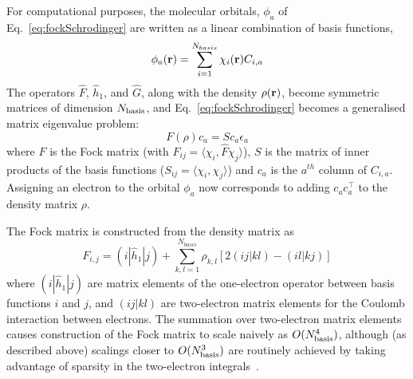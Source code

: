 \documentclass[twoside,11pt]{article}
\begin{document}
For computational purposes, the molecular orbitals, $\phi_a$ of Eq.~\ref{eq:fockSchrodinger} are written as a linear combination of basis functions,
\begin{equation}\label{eq:lcao}
\phi_a({\bf r}) = \sum_{i=1}^{N_{basis}} \chi_i({\bf r}) C_{i,a}
\end{equation}
The operators $\hat{F}$, $\hat{h}_1$, and $\hat{G}$, along with the density $\rho({\bf r})$, become symmetric matrices of dimension $N_{\rm basis}$, and Eq.~\ref{eq:fockSchrodinger} becomes a generalised matrix eigenvalue problem:
\begin{equation}\label{eq:fockMatrix}
F(\rho)c_a = Sc_a\epsilon_a
\end{equation}
where $F$ is the Fock matrix (with $F_{ij} = \langle \chi_i, \hat F\chi_j\rangle$), $S$ is the matrix of inner products of the basis functions ($S_{ij} = \langle\chi_i,\chi_j\rangle$) and $c_a$ is the $a^{th}$ column of $C_{i,a}$.  Assigning an electron to the orbital $\phi_a$ now corresponds to adding $c_a c_a^\top$ to the density matrix $\rho$.

The Fock matrix is constructed from the density matrix as
\begin{equation}\label{eq:fockMatrixFull}
F_{i,j} = (i|\hat{h}_1|j) + \sum_{k,l=1}^{N_{basis}} \rho_{k,l} 
\left[ 2 (ij|kl) - (il|kj) \right]
\end{equation}
where $(i|\hat{h}_1|j)$ are matrix elements of the one-electron operator between basis functions $i$ and $j$, and $(ij|kl)$ are two-electron matrix elements for the Coulomb interaction between electrons. The summation over two-electron matrix elements causes construction of the Fock matrix to scale naively as $O(N_{\rm basis}^4)$, although (as described above) scalings closer to $O(N_{\rm basis}^3)$ are routinely achieved by taking advantage of sparsity in the two-electron integrals~\citep{cook}.





\end{document}
